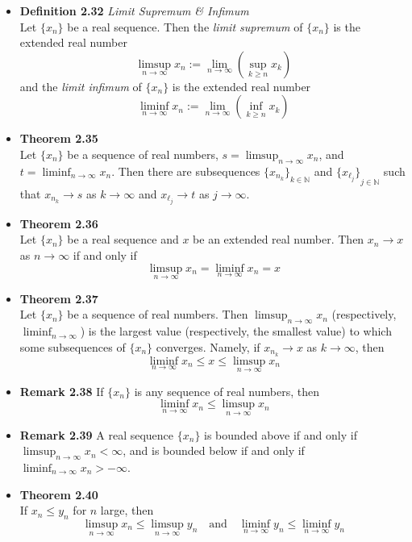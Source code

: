 \documentclass[11pt,a4paper]{article}
\begin{document}
\begin{itemize}
    \item \textbf{Definition 2.32} \emph{Limit Supremum \& Infimum} \\
        Let $\{x_n\}$ be a real sequence.
        Then the \emph{limit supremum} of $\{x_n\}$ is the extended real number
        \[
            \limsup_{n \to \infty} x_n := \lim_{n \to \infty} (\sup_{k \geq n} x_k)
        \]
        and the \emph{limit infimum} of $\{x_n\}$ is the extended real number
        \[
            \liminf_{n \to \infty} x_n := \lim_{n \to \infty} (\inf_{k \geq n} x_k)
        \]

    \item \textbf{Theorem 2.35} \\
        Let $\{x_n\}$ be a sequence of real numbers, $s = \limsup_{n \to \infty} x_n$,
        and $t = \liminf_{n \to \infty} x_n$.
        Then there are subsequences ${\{x_n_k\}}_{k \in \mathbb{N}}$ and
        ${\{x_\ell_j\}}_{j \in \mathbb{N}}$ such that
        $x_n_k \to s$ as $k \to \infty$ and $x_\ell_j \to t$ as $j \to \infty$.

    \item \textbf{Theorem 2.36} \\
        Let $\{x_n\}$ be a real sequence and $x$ be an extended real number.
        Then $x_n \to x$ as $n \to \infty$ if and only if
        \[
            \limsup_{n \to \infty} x_n = \liminf_{n \to \infty} x_n = x
        \]

    \item \textbf{Theorem 2.37} \\
        Let $\{x_n\}$ be a sequence of real numbers.
        Then $\limsup_{n \to \infty} x_n$ (respectively, $\liminf_{n \to \infty}$) is the largest
        value (respectively, the smallest value) to which some subsequences of $\{x_n\}$
        converges.
        Namely, if $x_n_k \to x$ as $k \to \infty$, then
        \[
            \liminf_{n \to \infty} x_n \leq x \leq \limsup_{n \to \infty} x_n
        \]

    \item \textbf{Remark 2.38}
        If $\{x_n\}$ is any sequence of real numbers, then
        \[
            \liminf_{n \to \infty} x_n \leq \limsup_{n \to \infty} x_n
        \]

    \item \textbf{Remark 2.39}
        A real sequence $\{x_n\}$ is bounded above if and only if
        $\limsup_{n \to \infty} x_n < \infty$, and is bounded below if and only if
        $\liminf_{n \to \infty} x_n > -\infty$.

    \item \textbf{Theorem 2.40} \\
        If $x_n \leq y_n$ for $n$ large, then
        \[
            \limsup_{n \to \infty} x_n \leq \limsup_{n \to \infty} y_n \quad \text{and} \quad
            \liminf_{n \to \infty} y_n \leq \liminf_{n \to \infty} y_n
        \]

\end{itemize}
\end{document}
